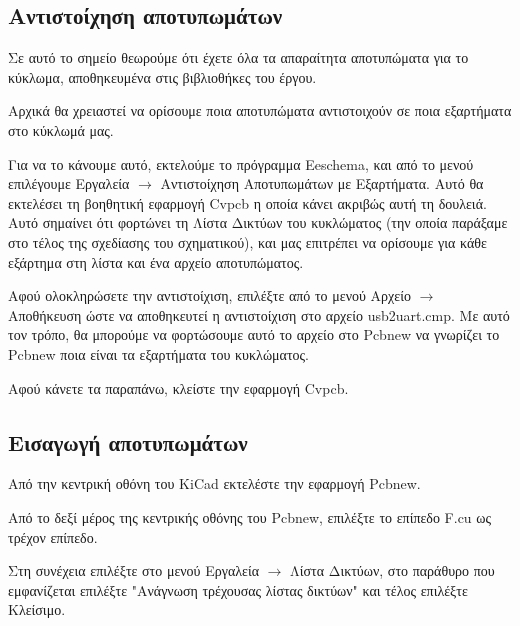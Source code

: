 \documentclass[a4paper]{article}
\begin{document}
\subsection{Αντιστοίχηση αποτυπωμάτων}
Σε αυτό το σημείο θεωρούμε ότι έχετε όλα τα απαραίτητα αποτυπώματα για το κύκλωμα, αποθηκευμένα στις βιβλιοθήκες του έργου.

Αρχικά θα χρειαστεί να ορίσουμε ποια αποτυπώματα αντιστοιχούν σε ποια εξαρτήματα στο κύκλωμά μας. 

Για να το κάνουμε αυτό, εκτελούμε το πρόγραμμα Eeschema, και από το μενού επιλέγουμε Εργαλεία $\rightarrow$ Αντιστοίχηση Αποτυπωμάτων με Εξαρτήματα. Αυτό θα εκτελέσει τη βοηθητική εφαρμογή \textenglish{Cvpcb} η οποία κάνει ακριβώς αυτή τη δουλειά. Αυτό σημαίνει ότι φορτώνει τη Λίστα Δικτύων του κυκλώματος (την οποία παράξαμε στο τέλος της σχεδίασης του σχηματικού), και μας επιτρέπει να ορίσουμε για κάθε εξάρτημα στη λίστα και ένα αρχείο αποτυπώματος.

\begin{figure}
  \begin{center}
    \label{fig:kicad-main}
  \end{center}
\end{figure}

Αφού ολοκληρώσετε την αντιστοίχιση, επιλέξτε από το μενού Αρχείο $\rightarrow$ Αποθήκευση ώστε να αποθηκευτεί η αντιστοίχιση στο αρχείο usb2uart.cmp. Με αυτό τον τρόπο, θα μπορούμε να φορτώσουμε αυτό το αρχείο στο \textenglish{Pcbnew} να γνωρίζει το \textenglish{Pcbnew} ποια είναι τα εξαρτήματα του κυκλώματος. 

Αφού κάνετε τα παραπάνω, κλείστε την εφαρμογή \textenglish{Cvpcb}.


\subsection{Εισαγωγή αποτυπωμάτων}
Από την κεντρική οθόνη του \textenglish{KiCad} εκτελέστε την εφαρμογή \textenglish{Pcbnew}. 

Από το δεξί μέρος της κεντρικής οθόνης του \textenglish{Pcbnew}, επιλέξτε το επίπεδο F.cu ως τρέχον επίπεδο.

Στη συνέχεια επιλέξτε στο μενού Εργαλεία $\rightarrow$ Λίστα Δικτύων, στο παράθυρο που εμφανίζεται επιλέξτε "Ανάγνωση τρέχουσας λίστας δικτύων" και τέλος επιλέξτε Κλείσιμο.
\end{document}
